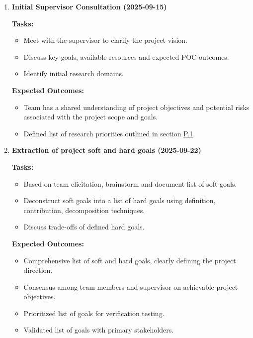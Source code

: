 \documentclass[12pt]{article}
\theoremstyle{definition}
\begin{document}
\begin{enumerate}

  \item \textbf{Initial Supervisor Consultation (2025-09-15)}  

  \textbf{Tasks:}
  \begin{itemize}
      \item Meet with the supervisor to clarify the project vision. 
      \item Discuss key goals, available resources and expected POC outcomes. 
      \item Identify initial research domains. 
  \end{itemize}

  \textbf{Expected Outcomes:}
  \begin{itemize}
      \item Team has a shared understanding of project objectives and potential
       risks associated with the project scope and goals. 
      \item Defined list of research priorities outlined in section
      \hyperref[item: p1]{P.1}.
  \end{itemize}

  \vspace{0.8em}

  \item \textbf{Extraction of project soft and hard goals (2025-09-22)}  

  \textbf{Tasks:}
  \begin{itemize}
      \item Based on team elicitation, brainstorm and document list of soft
      goals. 
      \item Deconstruct soft goals into a list of hard goals using definition,
       contribution, decomposition techniques. 
      \item Discuss trade-offs of defined hard goals. 
  \end{itemize}

  \textbf{Expected Outcomes:}
  \begin{itemize}
      \item Comprehensive list of soft and hard goals, clearly defining the
      project direction. 
      \item Consensus among team members and supervisor on achievable project
       objectives. 
      \item Prioritized list of goals for verification testing. 
      \item Validated list of goals with primary stakeholders. 
  \end{itemize}


\end{enumerate}
\end{document}
